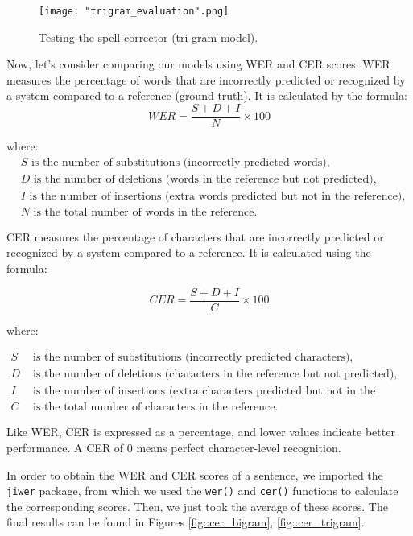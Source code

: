 \documentclass[11pt, a4paper]{article}
\begin{document}
	\begin{figure}
	    \centering
	    \texttt{[image: "trigram\_evaluation".png]}
	    \caption{Testing the spell corrector (tri-gram model).}
	    \label{fig::spell_check_example_trigram}
	\end{figure}


     Now, let's consider comparing our models using WER and CER scores. WER measures the percentage of words that are incorrectly predicted or recognized by a system compared to a reference (ground truth). It is calculated by the formula: 
      \[  WER = \frac{S + D + I}{N} \times 100 \]

    where:
    \begin{align*}
    & S \text{ is the number of substitutions (incorrectly predicted words)}, \\
    & D \text{ is the number of deletions (words in the reference but not predicted)}, \\
    & I \text{ is the number of insertions (extra words predicted but not in the reference)}, \\
    & N \text{ is the total number of words in the reference}.
    \end{align*}

    CER measures the percentage of characters that are incorrectly predicted or recognized by a system compared to a reference. It is calculated using the formula:

    \[ CER = \frac{S + D + I}{C} \times 100 \]

    where:

    \begin{align*}
    S & \text{ is the number of substitutions (incorrectly predicted characters),} \\
    D & \text{ is the number of deletions (characters in the reference but not predicted),} \\
    I & \text{ is the number of insertions (extra characters predicted but not in the reference),} \\
    C & \text{ is the total number of characters in the reference.}
    \end{align*}

    Like WER, CER is expressed as a percentage, and lower values indicate better performance. A CER of 0 means perfect character-level recognition.

    
	In order to obtain the WER and CER scores of a sentence, we imported the \texttt{jiwer} package, from which we used the \texttt{wer()} and \texttt{cer()} functions to calculate the corresponding scores. Then, we just took the average of these scores. The final results can be found in Figures \ref{fig::cer_bigram}, \ref{fig::cer_trigram}.
	
\end{document}
